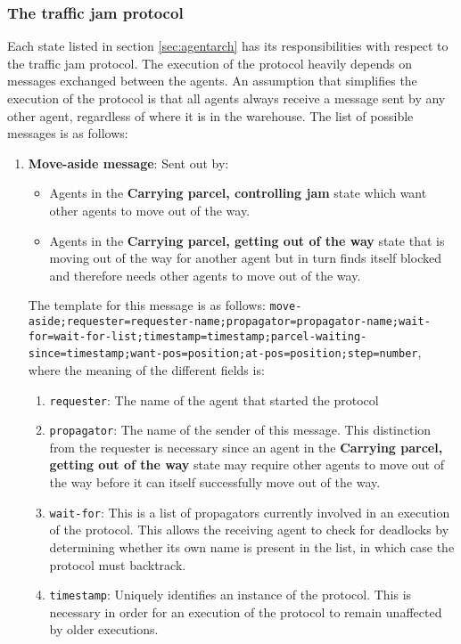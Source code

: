 \subsubsection{The traffic jam protocol}\label{sec:protocol}
Each state listed in section \ref{sec:agentarch} has its responsibilities with respect to the traffic jam protocol. The execution of the protocol heavily depends on messages exchanged between the agents. An assumption that simplifies the execution of the protocol is that all agents always receive a message sent by any other agent, regardless of where it is in the warehouse. The list of possible messages is as follows:
\begin{enumerate}
    \item \textbf{Move-aside message}: Sent out by:
        \begin{itemize}
            \item Agents in the \textbf{Carrying parcel, controlling jam} state which want other agents to move out of the way.
            \item Agents in the \textbf{Carrying parcel, getting out of the way} state that is moving out of the way for another agent but in turn finds itself blocked and therefore needs other agents to move out of the way.
        \end{itemize}
    The template for this message is as follows: \texttt{move-aside;requester=requester-name;propagator=propagator-name;wait-for=wait-for-list;timestamp=timestamp;parcel-waiting-since=timestamp;want-pos=position;at-pos=position;step=number}, where the meaning of the different fields is:
        \begin{enumerate}
            \item \texttt{requester}: The name of the agent that started the protocol
            \item \texttt{propagator}: The name of the sender of this message. This distinction from the requester is necessary since an agent in the \textbf{Carrying parcel, getting out of the way} state may require other agents to move out of the way before it can itself successfully move out of the way.
            \item \texttt{wait-for}: This is a list of propagators currently involved in an execution of the protocol. This allows the receiving agent to check for deadlocks by determining whether its own name is present in the list, in which case the protocol must backtrack.
            \item \texttt{timestamp}: Uniquely identifies an instance of the protocol. This is necessary in order for an execution of the protocol to remain unaffected by older executions.

\end{enumerate}
\end{enumerate}
